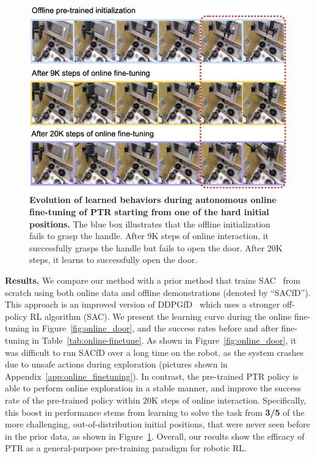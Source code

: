 \begin{figure}
\vspace{-0.4cm}
\centering
\includegraphics[width=0.8\linewidth]{chapters/ptr/online_improvement.png}
\vspace{-0.24cm}
\caption{\footnotesize{\label{fig:online-improvement} \textbf{Evolution of learned behaviors during autonomous online fine-tuning of PTR starting from one of the hard initial positions.} The blue box illustrates that the offline initialization fails to grasp the handle. After 9K steps of online interaction, it successfully grasps the handle but fails to open the door. After 20K steps, it learns to successfully open the door.}}
\vspace{-0.4cm}
\end{figure}

\textbf{Results.} We compare our method with a prior method that trains SAC~\citep{haarnoja2018soft} from scratch using both online data and offline demonstrations (denoted by ``SACfD''). This approach is an improved version of DDPGfD~\citep{vecerik2017leveraging} which uses a stronger off-policy RL algorithm (SAC). We present the learning curve during the online fine-tuning in Figure~\ref{fig:online_door}, and the success rates before and after fine-tuning in Table~\ref{tab:online-finetune}. As shown in Figure~\ref{fig:online_door}, it was difficult to run SACfD over a long time on the robot, as the system crashes due to unsafe actions during exploration (pictures shown in Appendix~\ref{app:online_finetuning}). In contrast, the pre-trained PTR policy is able to perform online exploration in a stable manner, and improve the success rate of the pre-trained policy within 20K steps of online interaction. Specifically, this boost in performance stems from learning to solve the task from \textbf{3/5} of the more challenging, out-of-distribution initial positions, that were never seen before in the prior data, as shown in Figure~\ref{fig:online-improvement}. Overall, our results show the efficacy of PTR as a general-purpose pre-training paradigm for robotic RL. 